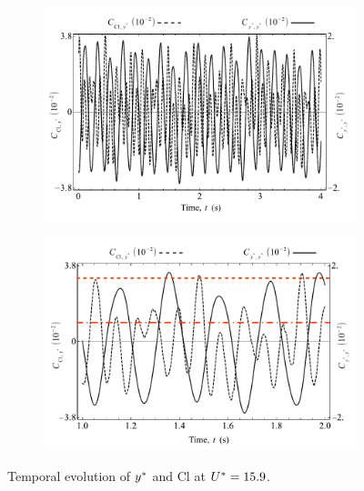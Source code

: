\documentclass[oneside]{utmthesis}
\begin{document}
\begin{figure}
  \centering
  \begin{subfigure}[h]{1\textwidth}
    \includegraphics[width=\textwidth]{figs/tempEvoCompare-a}
    \caption{}
    \label{fig:tempEvoCompare-a}
  \end{subfigure}

  \begin{subfigure}[h]{0.98\textwidth}
    \includegraphics[width=\textwidth]{figs/tempEvoCompare-b}
    \caption{}
    \label{fig:tempEvoCompare-b}
  \end{subfigure}
  \caption{Temporal evolution of $y^{*}$ and Cl at $U^{*} = 15.9$.} \label{fig:tempEvoCompare}
\end{figure}
\end{document}

